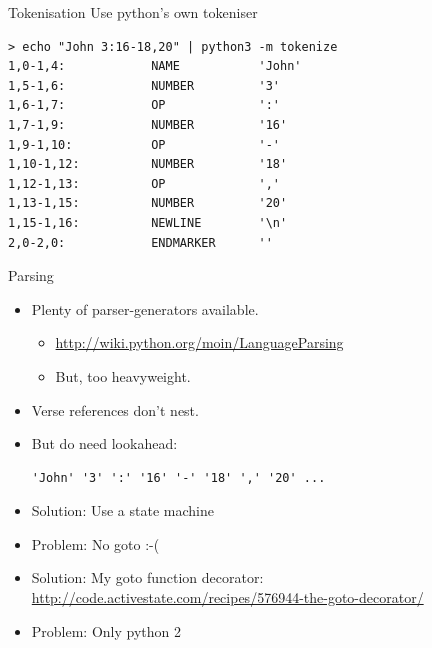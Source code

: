 \documentclass{beamer}
\begin{document}
\begin{frame}[fragile]{Tokenisation}
Use python's own tokeniser

\begin{verbatim}
> echo "John 3:16-18,20" | python3 -m tokenize
1,0-1,4:            NAME           'John'         
1,5-1,6:            NUMBER         '3'            
1,6-1,7:            OP             ':'            
1,7-1,9:            NUMBER         '16'           
1,9-1,10:           OP             '-'            
1,10-1,12:          NUMBER         '18'           
1,12-1,13:          OP             ','            
1,13-1,15:          NUMBER         '20'           
1,15-1,16:          NEWLINE        '\n'           
2,0-2,0:            ENDMARKER      ''             
\end{verbatim}

\end{frame}

\begin{frame}[fragile]{Parsing}

\begin{itemize}
\item Plenty of parser-generators available.
\begin{itemize}
\item \url{http://wiki.python.org/moin/LanguageParsing}

\item But, too heavyweight.
\end{itemize}

\item Verse references don't nest.

\item But do need lookahead:
\begin{verbatim}
'John' '3' ':' '16' '-' '18' ',' '20' ...
\end{verbatim}

\item Solution: Use a state machine

\pause
\item Problem: No goto :-(

\pause
\item Solution: My goto function decorator:\\
\url{http://code.activestate.com/recipes/576944-the-goto-decorator/}

\pause
\item Problem: Only python 2
\end{itemize}
\end{frame}
\end{document}
